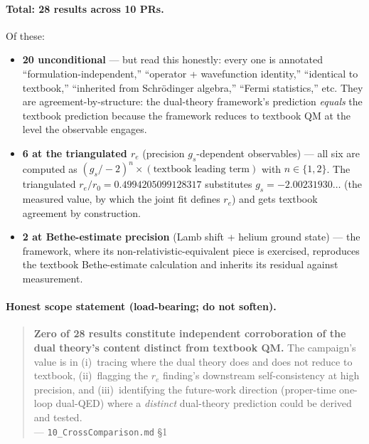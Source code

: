 \paragraph{Total: 28 results across 10 PRs.}
Of these:
\begin{itemize}[topsep=2pt,itemsep=0pt]
  \item \textbf{20 unconditional} --- but read this honestly: every one is
        annotated ``formulation-independent,'' ``operator + wavefunction
        identity,'' ``identical to textbook,'' ``inherited from Schr\"odinger
        algebra,'' ``Fermi statistics,'' etc. They are agreement-by-structure:
        the dual-theory framework's prediction \emph{equals} the textbook
        prediction because the framework reduces to textbook QM at the level
        the observable engages.
  \item \textbf{6 at the triangulated $r_e$} (precision $g_s$-dependent
        observables) --- all six are computed as
        $(g_s/{-}2)^n \times (\text{textbook leading term})$ with $n \in
        \{1, 2\}$. The triangulated $r_e/r_0 = 0.4994205099128317$ substitutes
        $g_s = -2.00231930\dots$ (the measured value, by which the joint fit
        defines $r_e$) and gets textbook agreement by construction.
  \item \textbf{2 at Bethe-estimate precision} (Lamb shift + helium ground
        state) --- the framework, where its non-relativistic-equivalent piece
        is exercised, reproduces the textbook Bethe-estimate calculation and
        inherits its residual against measurement.
\end{itemize}

\paragraph{Honest scope statement (load-bearing; do not soften).}
\begin{quotation}
\noindent\textbf{Zero of 28 results constitute independent corroboration of
the dual theory's content distinct from textbook QM.} The campaign's value
is in (i)~tracing where the dual theory does and does not reduce to textbook,
(ii)~flagging the $r_e$ finding's downstream self-consistency at high
precision, and (iii)~identifying the future-work direction (proper-time
one-loop dual-QED) where a \emph{distinct} dual-theory prediction could be
derived and tested.\\[2pt]
\hspace*{\fill}--- \texttt{10\_CrossComparison.md} \S1
\end{quotation}

